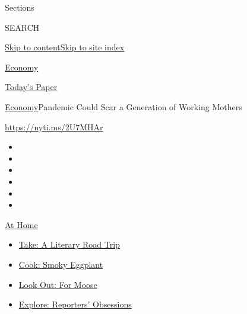 Sections

SEARCH

\protect\hyperlink{site-content}{Skip to
content}\protect\hyperlink{site-index}{Skip to site index}

\href{https://www.nytimes3xbfgragh.onion/section/business/economy}{Economy}

\href{https://myaccount.nytimes3xbfgragh.onion/auth/login?response_type=cookie\&client_id=vi}{}

\href{https://www.nytimes3xbfgragh.onion/section/todayspaper}{Today's
Paper}

\href{/section/business/economy}{Economy}\textbar{}Pandemic Could Scar a
Generation of Working Mothers

\url{https://nyti.ms/2U7MHAr}

\begin{itemize}
\item
\item
\item
\item
\item
\item
\end{itemize}

\href{https://www.nytimes3xbfgragh.onion/spotlight/at-home?action=click\&pgtype=Article\&state=default\&region=TOP_BANNER\&context=at_home_menu}{At
Home}

\begin{itemize}
\tightlist
\item
  \href{https://www.nytimes3xbfgragh.onion/2020/07/28/books/time-for-a-literary-road-trip.html?action=click\&pgtype=Article\&state=default\&region=TOP_BANNER\&context=at_home_menu}{Take:
  A Literary Road Trip}
\item
  \href{https://www.nytimes3xbfgragh.onion/2020/07/29/magazine/bored-with-your-home-cooking-some-smoky-eggplant-will-fix-that.html?action=click\&pgtype=Article\&state=default\&region=TOP_BANNER\&context=at_home_menu}{Cook:
  Smoky Eggplant}
\item
  \href{https://www.nytimes3xbfgragh.onion/2020/07/27/travel/moose-michigan-isle-royale.html?action=click\&pgtype=Article\&state=default\&region=TOP_BANNER\&context=at_home_menu}{Look
  Out: For Moose}
\item
  \href{https://www.nytimes3xbfgragh.onion/interactive/2020/at-home/even-more-reporters-editors-diaries-lists-recommendations.html?action=click\&pgtype=Article\&state=default\&region=TOP_BANNER\&context=at_home_menu}{Explore:
  Reporters' Obsessions}
\end{itemize}

